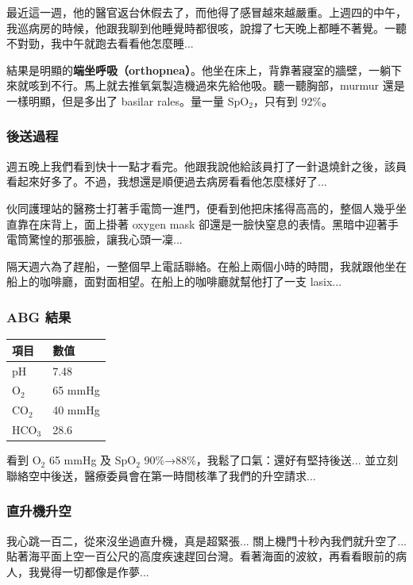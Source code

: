 \documentclass[12pt,a4paper]{article}
\begin{document}
最近這一週，他的醫官返台休假去了，而他得了感冒越來越嚴重。上週四的中午，我巡病房的時候，他跟我聊到他睡覺時都很咳，說撐了七天晚上都睡不著覺。一聽不對勁，我中午就跑去看看他怎麼睡...

結果是明顯的\textbf{端坐呼吸（orthopnea）}。他坐在床上，背靠著寢室的牆壁，一躺下來就咳到不行。馬上就去推氧氣製造機過來先給他吸。聽一聽胸部，murmur 還是一樣明顯，但是多出了 basilar rales。量一量 SpO$_2$，只有到 92\%。

\subsubsection{後送過程}

週五晚上我們看到快十一點才看完。他跟我說他給該員打了一針退燒針之後，該員看起來好多了。不過，我想還是順便過去病房看看他怎麼樣好了...

伙同護理站的醫務士打著手電筒一進門，便看到他把床搖得高高的，整個人幾乎坐直靠在床背上，面上掛著 oxygen mask 卻還是一臉快窒息的表情。黑暗中迎著手電筒驚惶的那張臉，讓我心頭一凜...

隔天週六為了趕船，一整個早上電話聯絡。在船上兩個小時的時間，我就跟他坐在船上的咖啡廳，面對面相望。在船上的咖啡廳就幫他打了一支 lasix...

\subsubsection{ABG 結果}

\begin{center}
\begin{tabular}{ll}
\toprule
\textbf{項目} & \textbf{數值} \\
\midrule
pH & 7.48 \\
O$_2$ & 65 mmHg \\
CO$_2$ & 40 mmHg \\
HCO$_3$ & 28.6 \\
\bottomrule
\end{tabular}
\end{center}

看到 O$_2$ 65 mmHg 及 SpO$_2$ 90\%→88\%，我鬆了口氣：還好有堅持後送... 並立刻聯絡空中後送，醫療委員會在第一時間核準了我們的升空請求...

\subsubsection{直升機升空}

我心跳一百二，從來沒坐過直升機，真是超緊張... 關上機門十秒內我們就升空了... 貼著海平面上空一百公尺的高度疾速趕回台灣。看著海面的波紋，再看看眼前的病人，我覺得一切都像是作夢...
\end{document}
